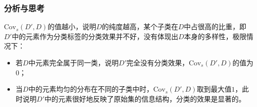 \documentclass{../presentation}
\newcommand{\Cov}{\text{Cov}}
\begin{document}
    \begin{frame}
        \frametitle{分析与思考}

        $\Cov_s(D',D)$的值越小，说明$D$的纯度越高，某个子类在$D$中占很高的比重，即$D'$中的元素作为分类标签的分类效果并不好，没有体现出$D$本身的多样性，极限情况下：

        \begin{itemize}
            \item 若$D$中元素完全属于同一类，说明$D'$完全没有分类效果，$\Cov_s(D',D)$的值为$0$；
            \item 当$D$中的元素均匀的分布在不同的子类中时，$\Cov_s(D',D)$取到最大值$1$，此时说明$D'$中的元素很好地反映了原始集的信息结构，分类的效果是显著的。
        \end{itemize}

    \end{frame}
\end{document}

